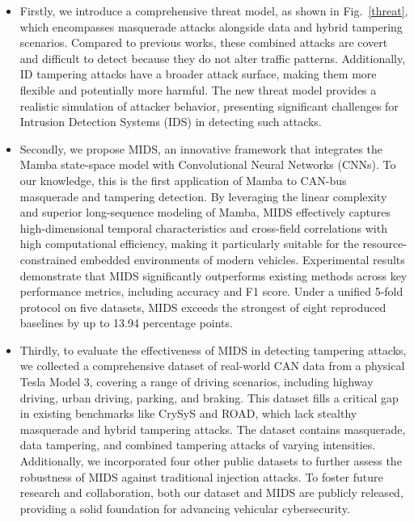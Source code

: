 \documentclass[lettersize,journal]{IEEEtran}
\begin{document}
\begin{itemize}
    \item Firstly, we introduce a comprehensive threat model, as shown in Fig.~\ref{threat}, which encompasses masquerade attacks alongside data and hybrid tampering scenarios. Compared to previous works, these combined attacks are covert and difficult to detect because they do not alter traffic patterns. Additionally, ID tampering attacks have a broader attack surface, making them more flexible and potentially more harmful. The new threat model provides a realistic simulation of attacker behavior, presenting significant challenges for Intrusion Detection Systems (IDS) in detecting such attacks.
    
    \item Secondly, we propose MIDS, an innovative framework that integrates the Mamba state-space model with Convolutional Neural Networks (CNNs). To our knowledge, this is the first application of Mamba to CAN-bus masquerade and tampering detection. By leveraging the linear complexity and superior long-sequence modeling of Mamba, MIDS effectively captures high-dimensional temporal characteristics and cross-field correlations with high computational efficiency, making it particularly suitable for the resource-constrained embedded environments of modern vehicles. Experimental results demonstrate that MIDS significantly outperforms existing methods across key performance metrics, including accuracy and F1 score. Under a unified 5-fold protocol on five datasets, MIDS exceeds the strongest of eight reproduced baselines by up to 13.94 percentage points.
    
    \item Thirdly, to evaluate the effectiveness of MIDS in detecting tampering attacks, we collected a comprehensive dataset of real-world CAN data from a physical Tesla Model 3, covering a range of driving scenarios, including highway driving, urban driving, parking, and braking. This dataset fills a critical gap in existing benchmarks like CrySyS\cite{b33} and ROAD\cite{b34}, which lack stealthy masquerade and hybrid tampering attacks. The dataset contains masquerade, data tampering, and combined tampering attacks of varying intensities. Additionally, we incorporated four other public datasets\cite{b20,b28,b33,b34} to further assess the robustness of MIDS against traditional injection attacks. To foster future research and collaboration, both our dataset and MIDS are publicly released, providing a solid foundation for advancing vehicular cybersecurity.
    
\end{itemize}
\end{document}
